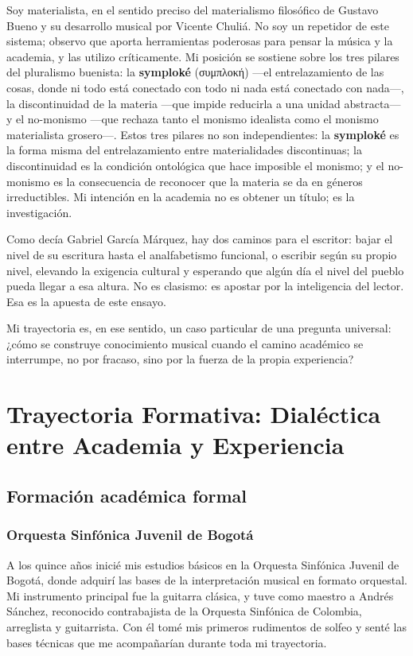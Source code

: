 \documentclass[14pt, a4paper]{article}
\begin{document}
Soy materialista, en el sentido preciso del materialismo filosófico
de Gustavo Bueno y su desarrollo musical por Vicente Chuliá. No soy
un repetidor de este sistema; observo que aporta herramientas
poderosas para pensar la música y la academia, y las utilizo
críticamente. Mi posición se sostiene sobre los tres pilares del
pluralismo buenista: la \textbf{symploké} (συμπλοκή) —el entrelazamiento de
las cosas, donde ni todo está conectado con todo ni nada está
conectado con nada—, la discontinuidad de la materia —que impide
reducirla a una unidad abstracta— y el no-monismo —que rechaza tanto
el monismo idealista como el monismo materialista grosero—. Estos
tres pilares no son independientes: la \textbf{symploké} es la forma misma
del entrelazamiento entre materialidades discontinuas; la
discontinuidad es la condición ontológica que hace imposible el
monismo; y el no-monismo es la consecuencia de reconocer que la
materia se da en géneros irreductibles. Mi intención en la academia
no es obtener un título; es la investigación.

Como decía Gabriel García Márquez, hay dos caminos para el escritor:
bajar el nivel de su escritura hasta el analfabetismo funcional, o
escribir según su propio nivel, elevando la exigencia cultural y
esperando que algún día el nivel del pueblo pueda llegar a esa altura.
No es clasismo: es apostar por la inteligencia del lector. Esa es la
apuesta de este ensayo.

Mi trayectoria es, en ese sentido, un caso particular de una pregunta
universal: ¿cómo se construye conocimiento musical cuando el camino
académico se interrumpe, no por fracaso, sino por la fuerza de la
propia experiencia?
\section{Trayectoria Formativa: Dialéctica entre Academia y Experiencia}
\label{trayectoria}
\subsection{Formación académica formal}
\label{formacion-academica}
\subsubsection{Orquesta Sinfónica Juvenil de Bogotá}
\label{orquesta-juvenil}
A los quince años inicié mis estudios básicos en la Orquesta
Sinfónica Juvenil de Bogotá, donde adquirí las bases de la
interpretación musical en formato orquestal. Mi instrumento principal
fue la guitarra clásica, y tuve como maestro a Andrés Sánchez,
reconocido contrabajista de la Orquesta Sinfónica de Colombia,
arreglista y guitarrista. Con él tomé mis primeros rudimentos de
solfeo y senté las bases técnicas que me acompañarían durante toda mi
trayectoria.
\end{document}
